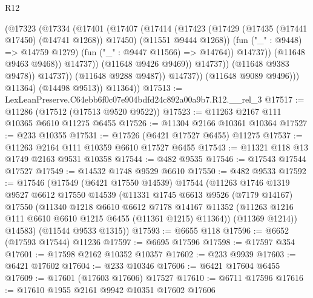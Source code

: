 \begin{lexlean}{R12}
\begin{coremodule}
                                    (@17323
                                      (@17334
                                        (@17401
                                          (@17407
                                            (@17414
                                              (@17423
                                                (@17429
                                                  (@17435 (@17441 @17450) (@14741 @1268))
                                                  @17450)
                                                (@11551 @9444 @1268))
                                              (fun ("_" : @9448) => @14759 @1279)
                                              (fun ("_" : @9447 @11566) => @14764))
                                            @14737))
                                        (@11648 @9463 @9468))
                                      @14737))
                                  (@11648 @9426 @9469))
                                @14737))
                            (@11648 @9383 @9478))
                          @14737))
                      (@11648 @9288 @9487))
                    @14737))
                (@11648 @9089 @9496)))
            @11364)
          (@14498 @9513))
        @11364))
@17513 := LexLeanPreserve.C64ebb6f0c07e904bdfd24c892a00a9b7.R12.__rel_3
@17517 := @11286 (@17512 (@17513 @9520 @9522))
@17523 := @11263 @2167 @111 @10365 @6610 @11275 @6455
@17526 := @11304 @2166 @10361 @10364
@17527 := @233 @10355
@17531 := @17526 (@6421 @17527 @6455) @11275
@17537 := @11263 @2164 @111 @10359 @6610 @17527 @6455
@17543 := @11321 @118 @13 @1749 @2163 @9531 @10358
@17544 := @482 @9535
@17546 := @17543 @17544 @17527
@17549 := @14532 @1748 @9529 @6610
@17550 := @482 @9533
@17592 := @17546
    (@17549
      (@6421 @17550 @14539)
      @17544
      (@11263
        @1746
        @1319
        @9527
        @6612
        @17550
        @14539
        (@11331
          @1745
          @6613
          @9526
          (@7179 @14167)
          @17550
          (@11340
            @1218
            @6610
            @6612
            @7178
            @14167
            @11352
            (@11263 @1216 @111 @6610 @6610 @1215 @6455 (@11361 @1215) @11364))
          (@11369 @1214))
        @14583)
      (@11544 @9533 @1315))
@17593 := @6655 @118
@17596 := @6652 (@17593 @17544) @11236
@17597 := @6695 @17596
@17598 := @17597 @354
@17601 := @17598 @2162 @10352 @10357
@17602 := @233 @9939
@17603 := @6421 @17602
@17604 := @233 @10346
@17606 := @6421 @17604 @6455
@17609 := @17601 (@17603 @17606) @17527
@17610 := @6711 @17596
@17616 := @17610 @1955 @2161 @9942 @10351 @17602 @17606

\end{coremodule}
\end{lexlean}
